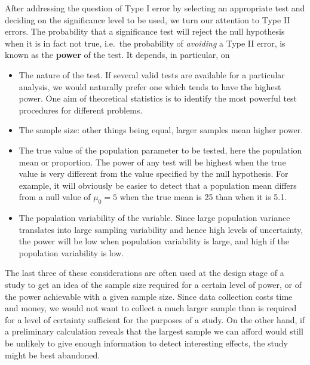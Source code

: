 After addressing the question of Type I error by selecting an
appropriate test and deciding on the significance level to be used, we
turn our attention to Type II errors. The probability that a
significance test will reject the null hypothesis when it is in fact not
true, i.e.\ the probability of \emph{avoiding} a Type II error, is known as the
\textbf{power} of the test. It depends, in particular, on
\begin{itemize}
\item
The nature of the test. If several valid tests are available for a
particular analysis, we would naturally prefer one which tends to have
the highest power. One aim of theoretical statistics is to identify the
most powerful test procedures for different problems.
\item
The sample size: other things being equal, larger samples mean higher power.
\item
The true value of the population parameter to be tested, here the
population mean or proportion. The power of any test will be highest
when the true value is very different from the value specified by the
null hypothesis. For example, it will obviously be easier to detect that
a population mean differs from a null value of $\mu_{0}=5$ when the true
mean is 25 than when it is 5.1.
\item
The population variability of the variable. Since large population
variance translates into large sampling variability and hence high
levels of uncertainty, the power will be low when population variability
is large, and high if the population variability is low.
\end{itemize}
The last three of these considerations are often used at the design
stage of a study to get an idea of the sample size required for a
certain level of power, or of the power achievable with a given sample
size. Since data collection costs time and money, we would not want to
collect a much larger sample than is required for a level of certainty
sufficient for the purposes of a study. On the other hand, if a
preliminary calculation reveals that the largest sample we can afford
would still be unlikely to give enough information to detect interesting
effects, the study might be best abandoned.

